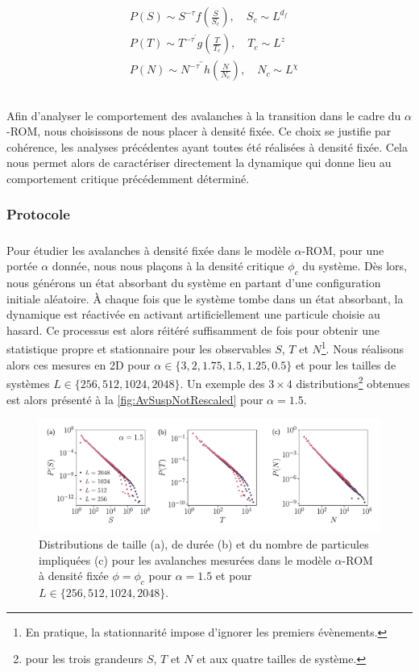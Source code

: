 \begin{equation}
	\begin{aligned}
		&P(S) \sim S^{-\tau}f\left( \frac{S}{S_c} \right), \quad S_c \sim L^{d_f}\\
		&P(T) \sim T^{-\tau^\prime}g\left( \frac{T}{T_c} \right), \quad T_c \sim L^{z}\\
		&P(N) \sim N^{-\tau^{\prime\prime}}h\left( \frac{N}{N_c} \right), \quad N_c \sim L^{\chi}\\
	\end{aligned}
	\label{eq:AvDistribSusp}
\end{equation}

\subparagraph{}Afin d'analyser le comportement des avalanches à la transition dans le cadre du $\alpha$-ROM, nous choisissons de nous placer à densité fixée. Ce choix se justifie par cohérence, les analyses précédentes ayant toutes été réalisées à densité fixée. Cela nous permet alors de caractériser directement la dynamique qui donne lieu au comportement critique précédemment déterminé.

\subsubsection{Protocole}

\subparagraph{}Pour étudier les avalanches à densité fixée dans le modèle $\alpha$-ROM, pour une portée $\alpha$ donnée, nous nous plaçons à la densité critique $\phi_c$ du système. Dès lors, nous générons un état absorbant du système en partant d'une configuration initiale aléatoire. \`A chaque fois que le système tombe dans un état absorbant, la dynamique est réactivée en activant artificiellement une particule choisie au hasard. Ce processus est alors réitéré suffisamment de fois pour obtenir une statistique propre et stationnaire pour les observables $S$, $T$ et $N$\footnote{En pratique, la stationnarité impose d'ignorer les premiers évènements.}. Nous réalisons alors ces mesures en 2D pour $\alpha \in \{ 3, 2, 1.75, 1.5, 1.25, 0.5\}$ et pour les tailles de systèmes $L \in \{ 256, 512, 1024, 2048 \}$. Un exemple des $3\times 4$ distributions\footnote{pour les trois grandeurs $S$, $T$ et $N$ et aux quatre tailles de système.} obtenues est alors présenté à la \autoref{fig:AvSuspNotRescaled} pour $\alpha = 1.5$.

\begin{figure}[h]
	\centering
	\includegraphics[width=\textwidth]{Chapitre3/Figures/Avalanches/Av_alpha15_edited.pdf}
	\caption{Distributions de taille (a), de durée (b) et du nombre de particules impliquées (c) pour les avalanches mesurées dans le modèle $\alpha$-ROM à densité fixée $\phi=\phi_c$ pour $\alpha = 1.5$ et pour $L \in \{ 256, 512, 1024, 2048 \}$.}
	\label{fig:AvSuspNotRescaled}
\end{figure}


